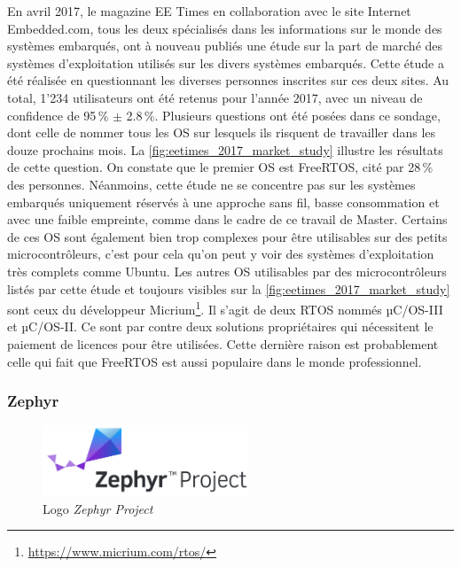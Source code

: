 En avril 2017, le magazine EE Times en collaboration avec le site Internet Embedded.com, tous les deux spécialisés dans les informations sur le monde des systèmes embarqués, ont à nouveau publiés une étude sur la part de marché des systèmes d'exploitation utilisés sur les divers systèmes embarqués\cite{2017Embe35:online}. Cette étude a été réalisée en questionnant les diverses personnes inscrites sur ces deux sites. Au total, 1'234 utilisateurs ont été retenus pour l'année 2017, avec un niveau de confidence de 95\,\% $\pm$ 2.8\,\%. Plusieurs questions ont été posées dans ce sondage, dont celle de nommer tous les OS sur lesquels ils risquent de travailler dans les douze prochains mois. La \autoref{fig:eetimes_2017_market_study} illustre les résultats de cette question. On constate que le premier OS est FreeRTOS, cité par 28\,\% des personnes. 
Néanmoins, cette étude ne se concentre pas sur les systèmes embarqués uniquement réservés à une approche sans fil, basse consommation et avec une faible empreinte, comme dans le cadre de ce travail de Master. Certains de ces OS sont également bien trop complexes pour être utilisables sur des petits microcontrôleurs, c'est pour cela qu'on peut y voir des systèmes d'exploitation très complets comme Ubuntu. Les autres OS utilisables par des microcontrôleurs listés par cette étude et toujours visibles sur la \autoref{fig:eetimes_2017_market_study} sont ceux du développeur Micrium\footnote{\url{https://www.micrium.com/rtos/}}. Il s'agit de deux RTOS nommés µC/OS-III et µC/OS-II. Ce sont par contre deux solutions propriétaires qui nécessitent le paiement de licences pour être utilisées. Cette dernière raison est probablement celle qui fait que FreeRTOS est aussi populaire dans le monde professionnel.


\FloatBarrier
\subsubsection{Zephyr}

\begin{figure}[ht!]
    \centering
    \includegraphics[width=0.55\textwidth]{Figures/StateOfTheArt/zephyr_logo.png}
    \caption{Logo \textit{Zephyr Project}}
    \label{fig:zephyr_logo}
\end{figure}

